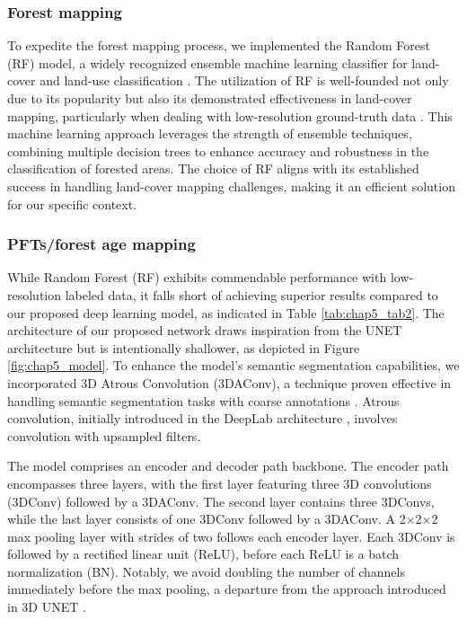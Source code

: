 \subsubsection{Forest mapping}
To expedite the forest mapping process, we implemented the Random Forest (RF) model, a widely recognized ensemble machine learning classifier for land-cover and land-use classification \citep{gislason2006random}. The utilization of RF is well-founded not only due to its popularity but also its demonstrated effectiveness in land-cover mapping, particularly when dealing with low-resolution ground-truth data \citep{robinson2021global}. This machine learning approach leverages the strength of ensemble techniques, combining multiple decision trees to enhance accuracy and robustness in the classification of forested areas. The choice of RF aligns with its established success in handling land-cover mapping challenges, making it an efficient solution for our specific context. \par
\subsubsection{PFTs\slash forest age mapping}

While Random Forest (RF) exhibits commendable performance with low-resolution labeled data, it falls short of achieving superior results compared to our proposed deep learning model, as indicated in Table \ref{tab:chap5_tab2}. The architecture of our proposed network draws inspiration from the UNET architecture \citep{ronneberger2015u} but is intentionally shallower, as depicted in Figure \ref{fig:chap5_model}. To enhance the model's semantic segmentation capabilities, we incorporated 3D Atrous Convolution (3DAConv), a technique proven effective in handling semantic segmentation tasks with coarse annotations \citep{chen2017rethinking}. Atrous convolution, initially introduced in the DeepLab architecture \citep{chen2017deeplab}, involves convolution with upsampled filters. \par

The model comprises an encoder and decoder path backbone. The encoder path encompasses three layers, with the first layer featuring three 3D convolutions (3DConv) followed by a 3DAConv. The second layer contains three 3DConvs, while the last layer consists of one 3DConv followed by a 3DAConv. A 2$\times$2$\times$2 max pooling layer with strides of two follows each encoder layer. Each 3DConv is followed by a rectified linear unit (ReLU), before each ReLU is a batch normalization (BN). Notably, we avoid doubling the number of channels immediately before the max pooling, a departure from the approach introduced in 3D UNET \citep{cciccek20163d}. \par

